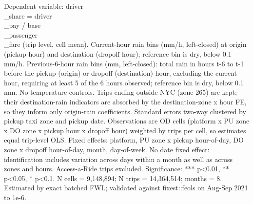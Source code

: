 \par \raggedright 
Dependent variable: driver\\_share = driver\\_pay / base\\_passenger\\_fare (trip level, cell mean). Current-hour rain bins (mm/h, left-closed) at origin (pickup hour) and destination (dropoff hour); reference bin is dry, below 0.1 mm/h. Previous-6-hour rain bins (mm, left-closed): total rain in hours t-6 to t-1 before the pickup (origin) or dropoff (destination) hour, excluding the current hour, requiring at least 5 of the 6 hours observed; reference bin is dry, below 0.1 mm. No temperature controls. Trips ending outside NYC (zone 265) are kept; their destination-rain indicators are absorbed by the destination-zone x hour FE, so they inform only origin-rain coefficients. Standard errors two-way clustered by pickup taxi zone and pickup date. Observations are OD cells (platform x PU zone x DO zone x pickup hour x dropoff hour) weighted by trips per cell, so estimates equal trip-level OLS. Fixed effects: platform, PU zone x pickup hour-of-day, DO zone x dropoff hour-of-day, month, day-of-week. No date fixed effect: identification includes variation across days within a month as well as across zones and hours. Access-a-Ride trips excluded. Significance: *** p<0.01, ** p<0.05, * p<0.1. N cells = 9,148,894; N trips = 14,364,514; months = 8. Estimated by exact batched FWL; validated against fixest::feols on Aug-Sep 2021 to 1e-6.
\par\endgroup
\ifdefined\ifclassloaded
{}
\fi
